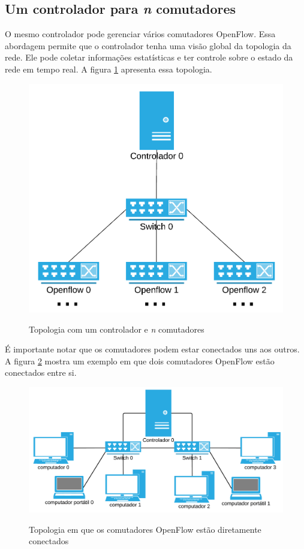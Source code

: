 \subsection{Um controlador para \emph{n} comutadores}

O mesmo controlador pode gerenciar vários comutadores OpenFlow.
Essa abordagem permite que o controlador tenha uma visão global da topologia
da rede.
Ele pode coletar informações estatísticas e ter controle sobre o estado 
da rede em tempo real.
A figura \ref{fig:controller-n-switches} apresenta essa topologia.

\begin{figure}[h!]
    \centering
    \includegraphics[scale=0.85]{img/controller-n-switches}
    \label{fig:controller-n-switches}
    \caption{Topologia com um controlador e \emph{n} comutadores}
\end{figure}

É importante notar que os comutadores podem estar conectados uns aos outros.
A figura \ref{fig:controller-n-linked-switches} mostra um exemplo em que 
dois comutadores OpenFlow estão conectados entre si.

\begin{figure}[h!]
    \centering
    \includegraphics[scale=0.8]{img/controller-n-linked-switches}
    \label{fig:controller-n-linked-switches}
    \caption{Topologia em que os comutadores OpenFlow 
    estão diretamente conectados}
\end{figure}


